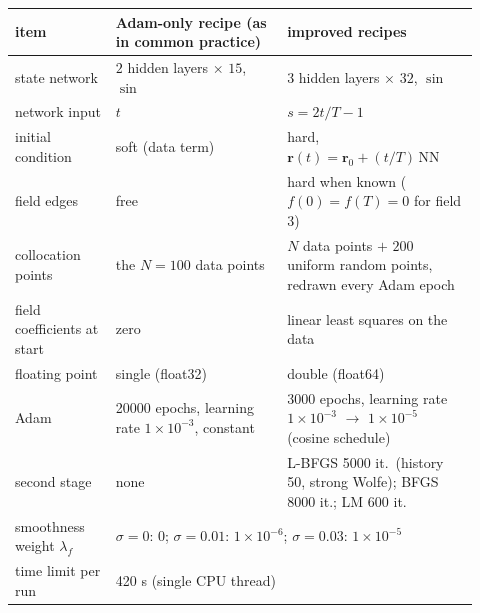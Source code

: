 \begin{tabular}{p{0.2\linewidth}p{0.34\linewidth}p{0.38\linewidth}}
\toprule
item & Adam-only recipe (as in common practice) & improved recipes \\
\midrule
state network & $2$ hidden layers $\times$ $15$, $\sin$ & $3$ hidden layers $\times$ $32$, $\sin$ \\
network input & $t$ & $s=2t/T-1$ \\
initial condition & soft (data term) & hard, $\boldsymbol r(t)=\boldsymbol r_0+(t/T)\,\mathrm{NN}$ \\
field edges & free & hard when known ($f(0)=f(T)=0$ for field 3) \\
collocation points & the $N=100$ data points & $N$ data points $+$ $200$ uniform random points, redrawn every Adam epoch \\
field coefficients at start & zero & linear least squares on the data \\
floating point & single (float32) & double (float64) \\
Adam & 20000 epochs, learning rate $1\times10^{-3}$, constant & 3000 epochs, learning rate $1\times10^{-3}$ $\to$ $1\times10^{-5}$ (cosine schedule) \\
second stage & none & L-BFGS 5000 it.\ (history 50, strong Wolfe); BFGS 8000 it.; LM 600 it. \\
smoothness weight $\lambda_f$ & \multicolumn{2}{l}{$\sigma=0$: $0$; $\sigma=0.01$: $1\times10^{-6}$; $\sigma=0.03$: $1\times10^{-5}$} \\
time limit per run & \multicolumn{2}{l}{420 s (single CPU thread)} \\
\bottomrule
\end{tabular}
